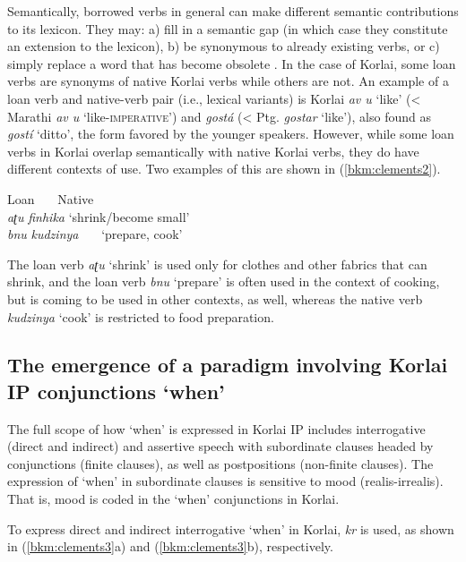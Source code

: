 \documentclass[output=paper,colorlinks,citecolor=brown]{langscibook}
\begin{document}
Semantically, borrowed verbs in general can make different semantic contributions to its lexicon. They may: a) fill in a semantic gap (in which case they constitute an extension to the lexicon), b) be synonymous to already existing verbs, or c) simply replace a word that has become obsolete  \citep{wohlgemuth2009typology}.  In the case of Korlai, some loan verbs are synonyms of native Korlai verbs while others are not. An example of a loan verb and native-verb pair (i.e., lexical variants) is Korlai \textit{av \textrtaild u} `like' (< Marathi \textit{av \textrtaild u} `like-\textsc{imperative}') and \textit{gostá} (< Ptg. \textit{gostar} `like'), also found as \textit{gostí} `ditto', the form favored by the younger speakers. However, while some loan verbs in Korlai overlap semantically with native Korlai verbs, they do have different contexts of use. Two examples of this are shown in (\ref{bkm:clements2}).

\ea\label{bkm:clements2}
\glll  Loan~~~       Native \\
  \textit{a​ʈu}                     \textit{finhika}             {`shrink/become small'}\\
 \textit{b\textschwa nu}                   \textit{kudzinya}~~~           {`prepare, cook'}\\
\z  



The loan verb \textit{a​ʈu} `shrink' is used only for clothes and other fabrics that can shrink, and the loan verb \textit{b\textschwa nu} `prepare' is often used in the context of cooking, but is coming to be used in other contexts, as well, whereas the native verb \textit{kudzinya} `cook' is restricted to food preparation.


\subsection{The emergence of a paradigm involving Korlai IP conjunctions `when'}

The full scope of how `when' is expressed in Korlai IP includes interrogative (direct and indirect) and assertive speech with subordinate clauses headed by conjunctions (finite clauses), as well as postpositions (non-finite clauses). The expression of `when' in subordinate clauses is sensitive to mood (realis-irrealis). That is, mood is coded in the `when' conjunctions in Korlai.

To express direct and indirect interrogative `when' in Korlai, \textit{k\textopeno r} is used, as shown in (\ref{bkm:clements3}a) and (\ref{bkm:clements3}b), respectively.
\end{document}
